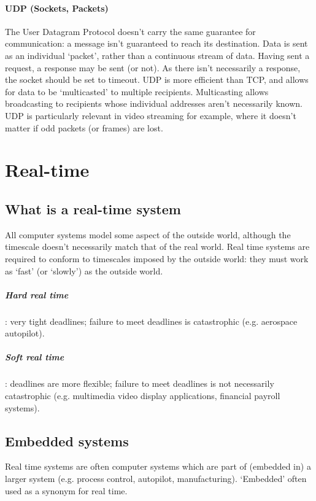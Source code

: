 \documentclass[a4paper,oneside]{report}
\begin{document}
      		\subsubsection{UDP (Sockets, Packets)}
      		The User Datagram Protocol doesn't carry the same guarantee for communication: a message isn't guaranteed to reach its destination. Data is sent as an individual `packet', rather than a continuous stream of data. Having sent a request, a response may be sent (or not). As there isn't necessarily a response, the socket should be set to timeout. UDP is more efficient than TCP, and allows for data to be `multicasted' to multiple recipients. Multicasting allows broadcasting to recipients whose individual addresses aren't necessarily known. UDP is particularly relevant in video streaming for example, where it doesn't matter if odd packets (or frames) are lost.
    	
\chapter{Real-time}
  	\section{What is a real-time system}
  	
  	All computer systems model some aspect of the outside world, although the timescale doesn't necessarily match that of the real world. Real time systems are required to conform to timescales imposed by the outside world: they must work as `fast' (or `slowly') as the outside world.
  	
  	\paragraph{Hard real time}: very tight deadlines; failure to meet deadlines is catastrophic (e.g. aerospace autopilot).
  	
  	\paragraph{Soft real time}: deadlines are more flexible; failure to meet deadlines is not necessarily catastrophic (e.g. multimedia video display applications, financial payroll systems).
  
  	
  	\section{Embedded systems}
  	Real time systems are often computer systems which are part of (embedded in) a larger system (e.g. process control, autopilot, manufacturing). ‘Embedded’ often used as a synonym for real time.
  	
\end{document}
